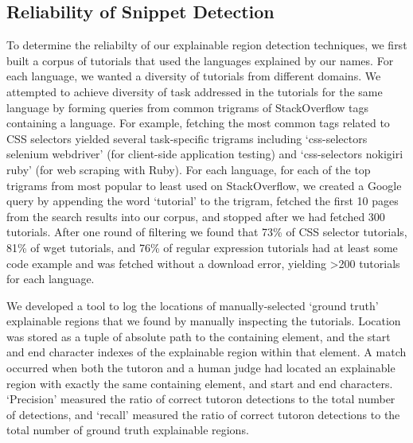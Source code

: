 \begin{changes}
\subsection{Reliability of Snippet Detection}

To determine the reliabilty of our explainable region detection techniques, we first built a corpus of tutorials that used the languages explained by our \glspl{name}.
For each language, we wanted a diversity of tutorials from different domains.
We attempted to achieve diversity of task addressed in the tutorials for the same language by forming queries from common trigrams of StackOverflow tags containing a language.
For example, fetching the most common tags related to CSS selectors yielded several task-specific trigrams including `css-selectors selenium webdriver' (for client-side application testing) and `css-selectors nokigiri ruby' (for web scraping with Ruby).
For each language, for each of the top trigrams from most popular to least used on StackOverflow, we created a Google query by appending the word `tutorial' to the trigram, fetched the first 10 pages from the search results into our corpus, and stopped after we had fetched 300 tutorials.
After one round of filtering we found that 73\% of CSS selector tutorials, 81\% of wget tutorials, and 76\% of regular expression tutorials had at least some code example and was fetched without a download error, yielding \textgreater 200 tutorials for each language.

We developed a tool to log the locations of manually-selected `ground truth' explainable regions that we found by manually inspecting the tutorials.
Location was stored as a tuple of absolute path to the containing element, and the start and end character indexes of the explainable region within that element.
A match occurred when both the tutoron and a human judge had located an explainable region with exactly the same containing element, and start and end characters.  
`Precision' measured the ratio of correct tutoron detections to the total number of detections, and `recall' measured the ratio of correct tutoron detections to the total number of ground truth explainable regions.


\end{changes}

